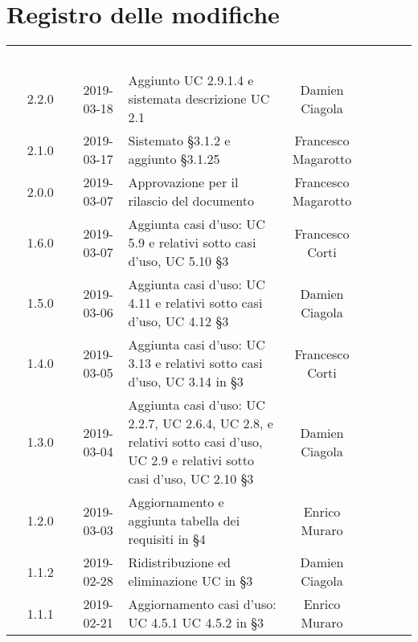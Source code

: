\section*{Registro delle modifiche}
{
	\renewcommand{\arraystretch}{1.5}
	\centering
	\begin{longtable}{ c c C{6cm} c c }
		\textcolor{white}{\textbf{Versione}} & \textcolor{white}{\textbf{Data}} & \textcolor{white}{\textbf{Descrizione}} & \textcolor{white}{\textbf{Autore}} & \textcolor{white}{\textbf{Ruolo}}\\
		
		2.2.0 &	
		2019-03-18 &	
		Aggiunto UC 2.9.1.4 e sistemata descrizione UC 2.1 &
		Damien Ciagola &
		\reda{} \\ 
		
		
		2.1.0 &
		2019-03-17 &
		Sistemato §3.1.2 e aggiunto §3.1.25 &
		Francesco Magarotto &
		\reda{} \\ 
		
		2.0.0 &
		2019-03-07 &
		Approvazione per il rilascio del documento &
		Francesco Magarotto &
		\Res{} \\
		
		1.6.0 &
		2019-03-07 &
		Aggiunta casi d'uso: UC 5.9 e relativi sotto casi d'uso, UC 5.10 §3 &
		Francesco Corti&
		\reda{} \\
		
		1.5.0 &
		2019-03-06 &
		Aggiunta casi d'uso: UC 4.11 e relativi sotto casi d'uso, UC 4.12 §3 &
		Damien Ciagola&
		\reda{} \\
		
		1.4.0 &
		2019-03-05 &
		Aggiunta casi d'uso: UC 3.13 e relativi sotto casi d'uso, UC 3.14 in §3 &
		Francesco Corti&
		\reda{} \\

		1.3.0 &
		2019-03-04 &
		Aggiunta casi d'uso: UC 2.2.7, UC 2.6.4, UC 2.8, e relativi sotto casi d'uso, UC 2.9 e relativi sotto casi d'uso, UC 2.10  §3 &
		Damien Ciagola&
		\reda{} \\
		
		
		1.2.0 &
		2019-03-03 &
		Aggiornamento e aggiunta tabella dei requisiti in §4 &
		Enrico Muraro&
		\reda{} \\
		
		1.1.2 &
		2019-02-28 &
		Ridistribuzione ed eliminazione UC in §3 &
		Damien Ciagola&
		\reda{} \\	
		
		
		1.1.1 &
		2019-02-21 &
		Aggiornamento casi d'uso: UC 4.5.1 UC 4.5.2 in §3 &
		Enrico Muraro&
		\reda{} \\		
				

\end{longtable}}
